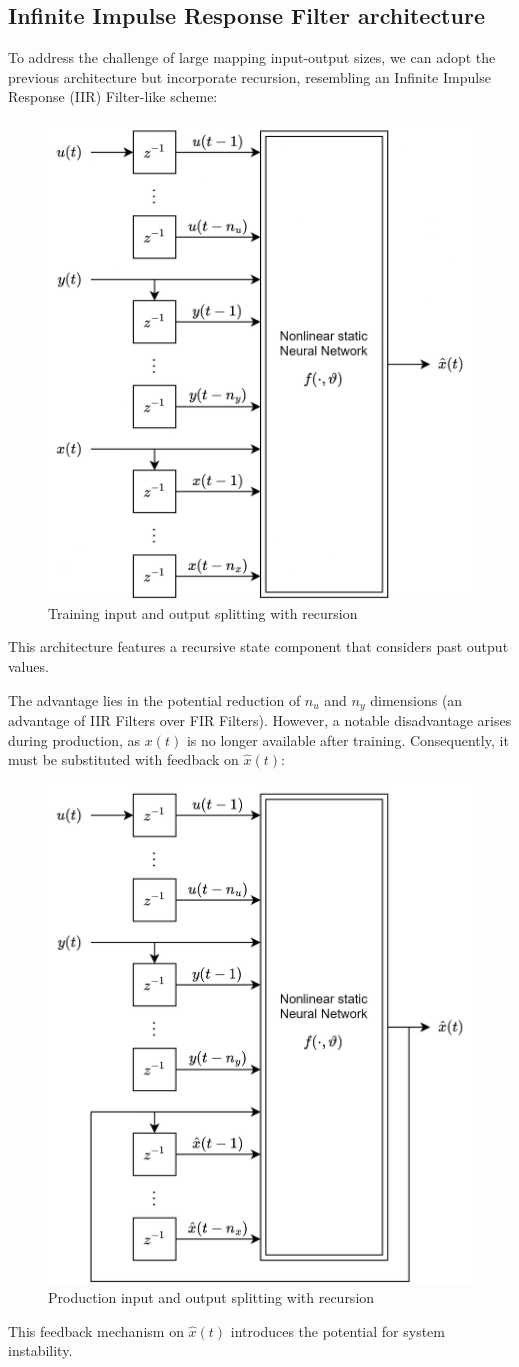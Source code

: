 \subsection{Infinite Impulse Response Filter architecture}
To address the challenge of large mapping input-output sizes, we can adopt the previous architecture but incorporate recursion, resembling an Infinite Impulse Response (IIR) Filter-like scheme:
\begin{figure}[H]
    \centering
    \includegraphics[width=0.5\linewidth]{images/split1.png}
    \caption{Training input and output splitting with recursion}
\end{figure}
This architecture features a recursive state component that considers past output values.

The advantage lies in the potential reduction of $n_u$ and $n_y$ dimensions (an advantage of IIR Filters over FIR Filters).
However, a notable disadvantage arises during production, as $x(t)$ is no longer available after training. 
Consequently, it must be substituted with feedback on $\hat{x}(t)$:
\begin{figure}[H]
    \centering
    \includegraphics[width=0.5\linewidth]{images/split2.png}
    \caption{Production input and output splitting with recursion}
\end{figure}
This feedback mechanism on $\hat{x}(t)$  introduces the potential for system instability.

